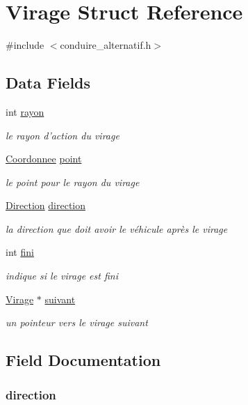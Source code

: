 \hypertarget{struct_virage}{\section{Virage Struct Reference}
\label{struct_virage}
}


{\ttfamily \#include $<$conduire\-\_\-alternatif.\-h$>$}

\subsection*{Data Fields}
\begin{DoxyCompactItemize}
\item 
int \hyperlink{struct_virage_a104155ea0ba383f3d696fdf8196bc0b8}{rayon}
\begin{DoxyCompactList}\small\item\em le rayon d'action du virage \end{DoxyCompactList}\item 
\hyperlink{struct_coordonnee}{Coordonnee} \hyperlink{struct_virage_ad99e63f3ba5dc63436b254343b8b5057}{point}
\begin{DoxyCompactList}\small\item\em le point pour le rayon du virage \end{DoxyCompactList}\item 
\hyperlink{conduire__alternatif_8h_a224b9163917ac32fc95a60d8c1eec3aa}{Direction} \hyperlink{struct_virage_a53421c695d00016ab925777d423b4eb6}{direction}
\begin{DoxyCompactList}\small\item\em la direction que doit avoir le véhicule après le virage \end{DoxyCompactList}\item 
int \hyperlink{struct_virage_a76db6e2a1080b7fef44d6887962a864f}{fini}
\begin{DoxyCompactList}\small\item\em indique si le virage est fini \end{DoxyCompactList}\item 
\hyperlink{struct_virage}{Virage} $\ast$ \hyperlink{struct_virage_ae9110ead9c34ba987de098d29d89c3e1}{suivant}
\begin{DoxyCompactList}\small\item\em un pointeur vers le virage suivant \end{DoxyCompactList}\end{DoxyCompactItemize}


\subsection{Field Documentation}
\hypertarget{struct_virage_a53421c695d00016ab925777d423b4eb6}{
\subsubsection[{direction}]{ direction}}\label{struct_virage_a53421c695d00016ab925777d423b4eb6}


